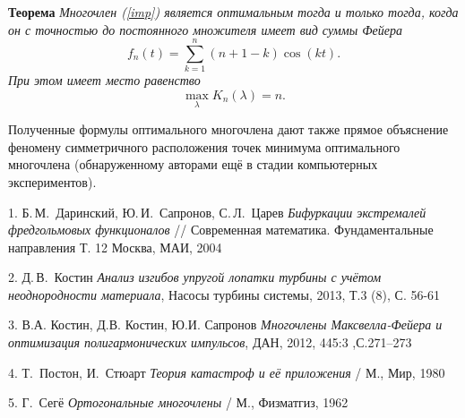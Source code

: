 {\bf Теорема} {\it
Многочлен (\ref{imp}) является оптимальным тогда и только тогда, когда он с точностью до постоянного множителя имеет вид суммы Фейера
$$
f_n(t)=\sum\limits_{k=1}^n (n+1-k) \cos(kt).
$$
При этом имеет место равенство
$$
\max\limits_{\lambda} K_n(\lambda) = n.
$$}

Полученные формулы оптимального многочлена дают также прямое
объяснение феномену симметричного расположения точек минимума
оптимального многочлена (обнаруженному авторами ещё в стадии
компьютерных экспериментов).



\litlist

1.  Б.\,М.~Даринский, Ю.\,И.~Сапронов, С.\,Л.~Царев {\it Бифуркации экстремалей фредгольмовых функционалов}
//
Современная
математика. Фундаментальные направления Т. 12 Москва, МАИ, 2004


2. Д.\,В.~Костин {\it Анализ изгибов упругой лопатки турбины с учётом
неоднородности материала},  Насосы турбины системы, 2013, Т.3 (8), С. 56-61

3. В.А. Костин, Д.В. Костин, Ю.И. Сапронов {\it Многочлены Максвелла-Фейера и оптимизация
полигармонических импульсов},  ДАН, 2012,  445:3 ,С.271--273

4. Т.~Постон, И.~Стюарт {\it Теория  катастроф  и  её  приложения} /  М., Мир, 1980

5. Г.~Сегё {\it Ортогональные многочлены} / М., Физматгиз, 1962
